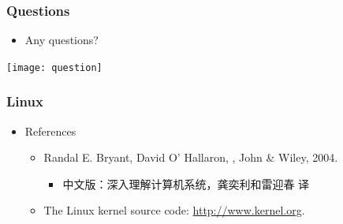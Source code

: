 \documentclass[CJKutf8,xcolor=pdftex,dvipsnames,table]{beamer}
\begin{document}
\begin{CJK*}{UTF8}{song}
\begin{frame}[fragile]
\fi

\end{frame}
  

  
  \begin{frame}
    \frametitle{Questions}
    \begin{itemize}
    \item{Any questions?}
    \end{itemize}
    \begin{center}
      \texttt{[image: question]}
    \end{center}
  \end{frame}
  
  \begin{frame}
    \frametitle{Linux} \pause
    \begin{itemize}
    \item{References} \pause
      \begin{itemize}
      \item{Randal E. Bryant, David O' Hallaron, , John \& Wiley, 2004.} \pause
        \begin{itemize}
        \item{中文版：深入理解计算机系统，龚奕利和雷迎春 译} \pause
        \end{itemize}
      \item{The Linux kernel source code: \url{http://www.kernel.org}.}
      \end{itemize}
    \end{itemize}
  \end{frame}
  

\end{CJK*}
\end{document}

